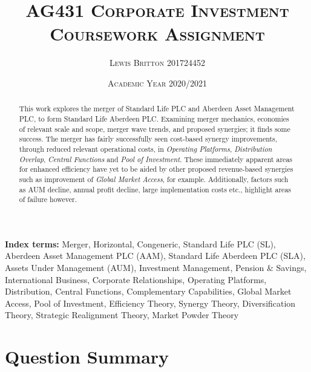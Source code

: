 \documentclass[11pt, english]{article}
\begin{document}

	\title{\textsc{AG431 Corporate Investment\\ Coursework Assignment}}
        \author{\textsc{Lewis Britton 201724452}}
        \date{\textsc{Academic Year 2020/2021}}
        \maketitle

        \begin{abstract}
		This work explores the merger of Standard Life PLC and Aberdeen Asset Management PLC, to form Standard Life Aberdeen PLC. Examining merger mechanics, economies of relevant scale and scope, merger wave trends, and proposed synergies; it finds some success. The merger has fairly successfully seen cost-based synergy improvements, through reduced relevant operational costs, in \textit{Operating Platforms}, \textit{Distribution Overlap}, \textit{Central Functions} and \textit{Pool of Investment}. These immediately apparent areas for enhanced efficiency have yet to be aided by other proposed revenue-based synergies such as improvement of \textit{Global Market Access}, for example. Additionally, factors such as AUM decline, annual profit decline, large implementation costs etc., highlight areas of failure however.
        \end{abstract}

	\textbf{Index terms:} Merger, Horizontal, Congeneric, Standard Life PLC (SL), Aberdeen Asset Management PLC (AAM), Standard Life Aberdeen PLC (SLA), Assets Under Management (AUM), Investment Management, Pension \& Savings, International Business, Corporate Relationships, Operating Platforms, Distribution, Central Functions, Complementary Capabilities, Global Market Access, Pool of Investment, Efficiency Theory, Synergy Theory, Diversification Theory, Strategic Realignment Theory, Market Powder Theory

\newpage


	\renewcommand{\contentsname}{Table of Contents}

        \tableofcontents

\newpage

\section*{Question Summary}
\end{document}

